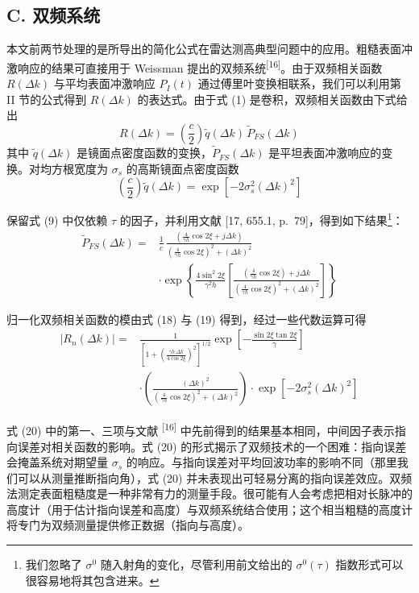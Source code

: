 \subsection*{C. 双频系统}

本文前两节处理的是所导出的简化公式在雷达测高典型问题中的应用。粗糙表面冲激响应的结果可直接用于 Weissman 提出的双频系统\textsuperscript{[16]}。由于双频相关函数 $R(\Delta k)$ 与平均表面冲激响应 $P_{I}(t)$ 通过傅里叶变换相联系，我们可以利用第 II 节的公式得到 $R(\Delta k)$ 的表达式。由于式 (1) 是卷积，双频相关函数由下式给出
\[
R(\Delta k) = \left(\frac{c}{2}\right)\widetilde{q}(\Delta k)\,\widetilde{P}_{FS}(\Delta k)
\tag{17}
\]
其中 $\widetilde{q}(\Delta k)$ 是镜面点密度函数的变换，$\widetilde{P}_{FS}(\Delta k)$ 是平坦表面冲激响应的变换。对均方根宽度为 $\sigma_{s}$ 的高斯镜面点密度函数
\[
\left(\frac{c}{2}\right)\widetilde{q}(\Delta k) = \exp\left[-2\sigma_{s}^{2}(\Delta k)^{2}\right]
\tag{18}
\]

保留式 (9) 中仅依赖 $\tau$ 的因子，并利用文献 [17, 655.1, p.~79]，得到如下结果\footnote{我们忽略了 $\sigma^{0}$ 随入射角的变化，尽管利用前文给出的 $\sigma^{0}(\tau)$ 指数形式可以很容易地将其包含进来。}：
\[
\begin{aligned}
\widetilde{P}_{FS}(\Delta k) ={} & \frac{1}{c}\,\frac{\left(\frac{4}{\gamma h}\cos 2\xi + j\Delta k\right)}{\left(\frac{4}{\gamma h}\cos 2\xi\right)^{2} + (\Delta k)^{2}} \\
& \cdot \exp\left\{ \frac{4\sin^{2}2\xi}{\gamma^{2}h}\left[\frac{\left(\frac{4}{\gamma h}\cos 2\xi\right) + j\Delta k}{\left(\frac{4}{\gamma h}\cos 2\xi\right)^{2} + (\Delta k)^{2}}\right] \right\}
\end{aligned}
\tag{19}
\]

归一化双频相关函数的模由式 (18) 与 (19) 得到，经过一些代数运算可得
\[
\begin{aligned}
\left|R_{n}(\Delta k)\right| ={} & \frac{1}{\left[1 + \left(\frac{\gamma h\,\Delta k}{4\cos 2\xi}\right)^{2}\right]^{1/2}}\exp\left[-\frac{\sin 2\xi\tan 2\xi}{\gamma}\right] \\
& \cdot \left(\frac{(\Delta k)^{2}}{\left(\frac{4}{\gamma h}\cos 2\xi\right)^{2} + (\Delta k)^{2}}\right) \cdot \exp\left[-2\sigma_{s}^{2}(\Delta k)^{2}\right]
\end{aligned}
\tag{20}
\]

式 (20) 中的第一、三项与文献 \textsuperscript{[16]} 中先前得到的结果基本相同，中间因子表示指向误差对相关函数的影响。式 (20) 的形式揭示了双频技术的一个困难：指向误差会掩盖系统对期望量 $\sigma_{s}$ 的响应。与指向误差对平均回波功率的影响不同（那里我们可以从测量推断指向角），式 (20) 并未表现出可轻易分离的指向误差效应。双频法测定表面粗糙度是一种非常有力的测量手段。很可能有人会考虑把相对长脉冲的高度计（用于估计指向误差和高度）与双频系统结合使用；这个相当粗糙的高度计将专门为双频测量提供修正数据（指向与高度）。

